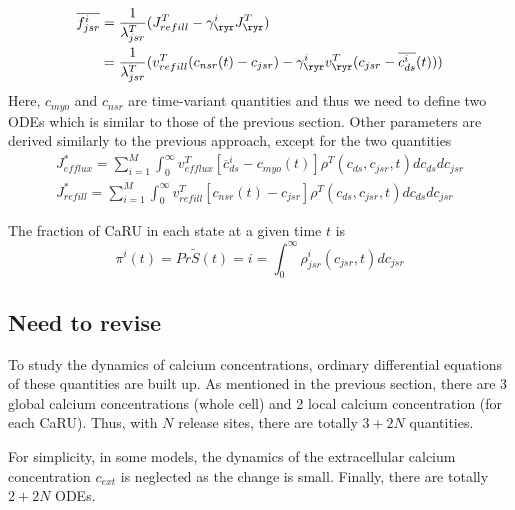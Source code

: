 \begin{equation}
  \label{eq:226}
  \begin{split}
    \overline{f^i_{jsr}} &= \frac{1}{\lambda^T_{jsr}}
    (J^T_{refill}-\gamma^i_\ryr J^T_\ryr) \\
    &=  \frac{1}{\lambda^T_{jsr}}
    (v^T_{refill} (c_{nsr}(t)-c_{jsr})-\gamma^i_\ryr v^T_\ryr(c_{jsr}-\overline{c^i_{ds}}(t)))
  \end{split}
\end{equation}
Here, $c_{myo}$ and $c_{nsr}$ are time-variant quantities and thus we
need to define two ODEs which is similar to those of the previous
section. Other parameters are derived similarly to the previous
approach, except for the two quantities
\begin{equation}
  \label{eq:234}
  \begin{split}
    J^*_{efflux} = \sum_{i=1}^M \int^\infty_0 v^T_{efflux} \left[ \overline{c}^i_{ds}
      - c_{myo}(t)  \right] \rho^T(c_{ds},c_{jsr}, t)dc_{ds}dc_{jsr}\\
    J^*_{refill} = \sum_{i=1}^M \int^\infty_0 v^T_{refill} \left[ c_{nsr}(t)
      - c_{jsr}  \right] \rho^T(c_{ds},c_{jsr}, t)dc_{ds}dc_{jsr}
    \
  \end{split}
\end{equation}

The fraction of CaRU in each state at a given time $t$ is
\begin{equation}
  \label{eq:235}
  \pi^i(t) = Pr{\tilde{S}(t) = i} = \int_0^\infty \rho^i_{jsr}(c_{jsr},t)dc_{jsr}
\end{equation}



\subsection{Need to revise}
\label{sec:need-revise}

To study the dynamics of calcium concentrations, ordinary differential
equations of these quantities are built up. As mentioned in the
previous section, there are 3 global calcium concentrations (whole
cell) and 2 local calcium concentration (for each CaRU). Thus, with
$N$ release sites, there are totally $3+2N$ quantities. 


For simplicity, in some models, the dynamics of the extracellular
calcium concentration $c_{ext}$ is neglected as the change is
small. Finally, there are totally $2+2N$ ODEs.

